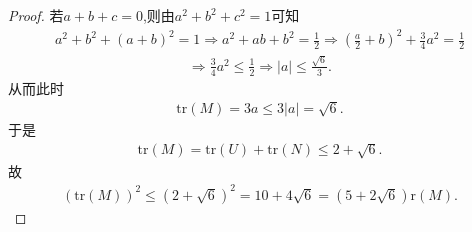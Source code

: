 \documentclass[../../main.tex]{subfiles}%
\begin{document}
\begin{proof}
若$a+b+c=0$,则由$a^2+b^2+c^2=1$可知
\begin{align*}
a^2+b^2+(a+b)^2=1\Rightarrow a^2+ab+b^2=\frac{1}{2}\Rightarrow \left( \frac{a}{2}+b \right) ^2+\frac{3}{4}a^2=\frac{1}{2}
\end{align*}
\begin{align*}
\Rightarrow \frac{3}{4}a^2\leqslant \frac{1}{2}\Rightarrow |a|\leqslant \frac{\sqrt{6}}{3}.
\end{align*}
从而此时
\begin{align*}
\mathrm{tr}(M) =3a\leqslant 3|a|=\sqrt{6}.
\end{align*}
于是
\begin{align*}
\mathrm{tr}(M) =\mathrm{tr}(U) +\mathrm{tr}(N) \leqslant 2+\sqrt{6}.
\end{align*}
故
\begin{align*}
(\mathrm{tr}(M))^2\leqslant \left( 2+\sqrt{6} \right) ^2=10+4\sqrt{6}=\left( 5+2\sqrt{6} \right) \mathrm{r}(M).
\end{align*}

\end{proof}
\end{document}
